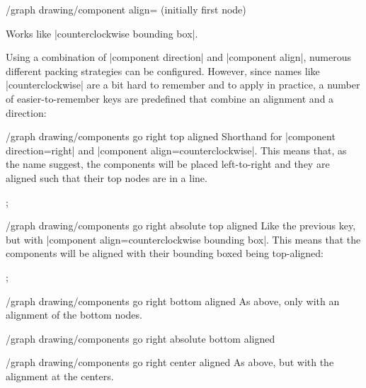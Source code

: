 {\begin{key}{/graph drawing/component align= (initially first node)}
\begin{itemize}
    Works like |counterclockwise bounding box|.
  \end{itemize}
\end{key}

Using a combination of |component direction| and |component align|,
numerous different packing strategies can be configured. However,
since names like |counterclockwise| are a bit hard to remember and to
apply in practice, a number of easier-to-remember keys are predefined
that combine an alignment and a direction:

\begin{key}{/graph drawing/components go right top aligned}
  Shorthand for |component direction=right| and
  |component align=counterclockwise|. This means that, as the name
  suggest, the components will be placed left-to-right and they are
  aligned such that their top nodes are in a line.  
\begin{codeexample}[]  
\tikz {};
\end{codeexample}
\end{key}

\begin{key}{/graph drawing/components go right absolute top aligned}
  Like the previous key, but with
  |component align=counterclockwise bounding box|. This means that the
  components will be aligned with their bounding boxed being
  top-aligned: 
\begin{codeexample}[]  
\tikz {};
\end{codeexample}
\end{key}

\begin{key}{/graph drawing/components go right bottom aligned}
  As above, only with an alignment of the bottom nodes.
\end{key}

\begin{key}{/graph drawing/components go right absolute bottom aligned}
\end{key}

\begin{key}{/graph drawing/components go right center aligned}
  As above, but with the alignment at the centers.
\end{key}

}
